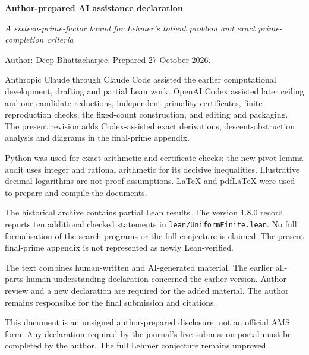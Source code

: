 \documentclass[11pt]{article}
\begin{document}
\textbf{Author-prepared AI assistance declaration}

\emph{A sixteen-prime-factor bound for Lehmer's totient problem and exact prime-completion criteria}

Author: Deep Bhattacharjee. Prepared 27 October 2026.

Anthropic Claude through Claude Code assisted the earlier computational
development, drafting and partial Lean work. OpenAI Codex assisted later
ceiling and one-candidate reductions, independent primality certificates,
finite reproduction checks, the fixed-count construction, and editing
and packaging. The present revision adds Codex-assisted exact derivations,
descent-obstruction analysis and diagrams in the final-prime appendix.

Python was used for exact arithmetic and certificate checks; the new
pivot-lemma audit uses integer and rational arithmetic for its decisive
inequalities. Illustrative decimal logarithms are not proof assumptions.
LaTeX and pdfLaTeX were used to prepare and compile the documents.

The historical archive contains partial Lean results. The version 1.8.0
record reports ten additional checked statements in
\texttt{lean/UniformFinite.lean}. No full formalisation of the search
programs or the full conjecture is claimed. The present final-prime
appendix is not represented as newly Lean-verified.

The text combines human-written and AI-generated material. The earlier
all-parts human-understanding declaration concerned the earlier version.
Author review and a new declaration are required for the added material.
The author remains responsible for the final submission and citations.

This document is an unsigned author-prepared disclosure, not an official
AMS form. Any declaration required by the journal's live submission
portal must be completed by the author. The full Lehmer conjecture
remains unproved.
\end{document}
